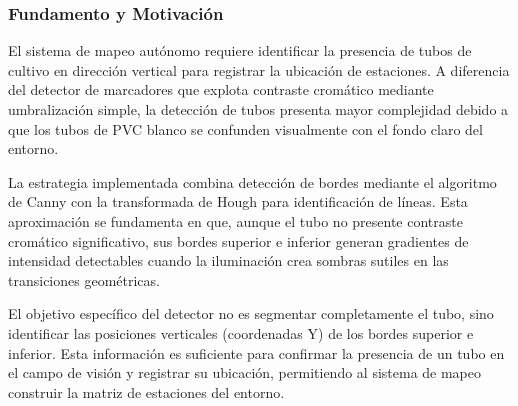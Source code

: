\subsubsection{Fundamento y Motivación}

El sistema de mapeo autónomo requiere identificar la presencia de tubos de cultivo en dirección vertical para registrar la ubicación de estaciones. A diferencia del detector de marcadores que explota contraste cromático mediante umbralización simple, la detección de tubos presenta mayor complejidad debido a que los tubos de PVC blanco se confunden visualmente con el fondo claro del entorno.

La estrategia implementada combina detección de bordes mediante el algoritmo de Canny con la transformada de Hough para identificación de líneas. Esta aproximación se fundamenta en que, aunque el tubo no presente contraste cromático significativo, sus bordes superior e inferior generan gradientes de intensidad detectables cuando la iluminación crea sombras sutiles en las transiciones geométricas.

El objetivo específico del detector no es segmentar completamente el tubo, sino identificar las posiciones verticales (coordenadas Y) de los bordes superior e inferior. Esta información es suficiente para confirmar la presencia de un tubo en el campo de visión y registrar su ubicación, permitiendo al sistema de mapeo construir la matriz de estaciones del entorno.

